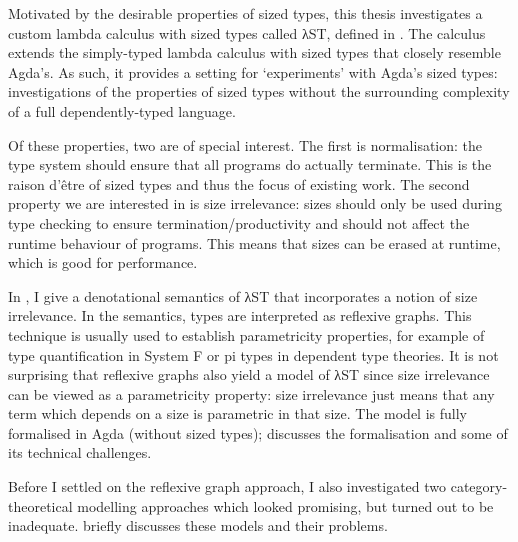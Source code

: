Motivated by the desirable properties of sized types, this thesis investigates a
custom lambda calculus with sized types called λST, defined in .
The calculus extends the simply-typed lambda calculus with sized types that
closely resemble Agda's. As such, it provides a setting for
\enquote*{experiments} with Agda's sized types: investigations of the properties
of sized types without the surrounding complexity of a full dependently-typed
language.

Of these properties, two are of special interest. The first is normalisation:
the type system should ensure that all programs do actually terminate. This is
the raison d'être of sized types and thus the focus of existing work. The
second property we are interested in is size irrelevance: sizes should only be
used during type checking to ensure termination/productivity and should not
affect the runtime behaviour of programs. This means that sizes can be erased at
runtime, which is good for performance.

In , I give a denotational semantics of λST that incorporates a
notion of size irrelevance. In the semantics, types are interpreted as reflexive
graphs. This technique is usually used to establish parametricity properties,
for example of type quantification in System F or pi types in dependent type
theories. It is not surprising that reflexive graphs also yield a model of λST
since size irrelevance can be viewed as a parametricity property: size
irrelevance just means that any term which depends on a size is parametric in
that size. The model is fully formalised in Agda (without sized types);
 discusses the formalisation and some of its technical
challenges.

Before I settled on the reflexive graph approach, I also investigated two
category-theoretical modelling approaches which looked promising, but turned out
to be inadequate.  briefly discusses these models and their
problems.
